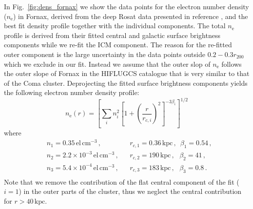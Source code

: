\documentclass[10pt,aps,pra,reprint,amsmath,amsfonts,amssymb,showpacs,nofootinbib,floatfix]{revtex4-1}
\newcommand{\rmn}{\mathrm}
\newcommand{\kpc}{\rmn{kpc}}
\newcommand{\rvir}{r_{200}}
\newcommand{\e}{\rmn{e}}
\begin{document}
In Fig.~\ref{fig:dens_fornax} we show the data points for the electron
number density ($n_\e$) in Fornax, derived from the deep Rosat data
presented in reference \cite{2002ApJ...565..883P}, and the best fit
density profile together with the individual components. The total
$n_\e$ profile is derived from their fitted central and galactic
surface brightness components while we re-fit the ICM component. The
reason for the re-fitted outer component is the large uncertainty in
the data points outside $0.2-0.3\rvir$ which we exclude in our
fit. Instead we assume that the outer slop of $n_\e$ follows the outer
slope of Fornax in the HIFLUGCS catalogue that is very similar to that
of the Coma cluster. Deprojecting the fitted surface brightness
components yields the following electron number density profile:
\begin{equation}
n_\e(r) = \left[\sum_i n_i^2\left[1+\left(\frac{r}{r_{c,i}}\right)^2\right]^{-3\beta_i}\right]^{1/2}
\end{equation}
where
\begin{align}
&n_1 = 0.35\, \rmn{el}\,\rmn{cm}^{-3}\,,
&&r_{c,1} = 0.36\,\kpc\,,\,\,\,
\beta_1 = 0.54\,, \nonumber\\
&n_2 = 2.2\times10^{-3}\,\rmn{el}\,\rmn{cm}^{-3}\,,
&&r_{c,2} = 190\,\kpc\,,\,\,\,\,
\beta_2 = 41\,, \nonumber\\
&n_3 = 5.4\times10^{-4}\,\rmn{el}\,\rmn{cm}^{-3}\,,
&&r_{c,3} = 183\,\kpc\,,\,\,\,\,
\beta_3 = 0.8\,. \nonumber\\
& &&
\label{fit_fornax}
\end{align}
Note that we remove the contribution of the flat central component of
the fit ($i=1$) in the outer parts of the cluster, thus we neglect the
central contribution for $r>40\,\kpc$.
\end{document}

